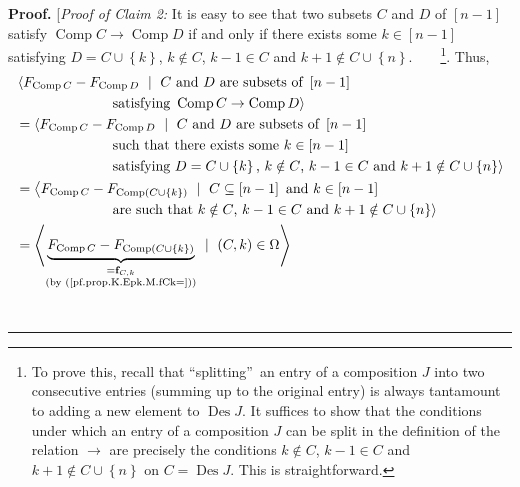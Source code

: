\documentclass[numbers=enddot,12pt,final,onecolumn,notitlepage]{scrartcl}%
\theoremstyle{definition}
\newenvironment{proof}[1][Proof]{\noindent\textbf{#1.} }{\ \rule{0.5em}{0.5em}}
\newenvironment{verlong}{}{}
\begin{document}
\begin{verlong}
\begin{proof}
[\textit{Proof of Claim 2:} It is easy to see that two subsets $C$ and $D$ of
$\left[  n-1\right]  $ satisfy $\operatorname*{Comp}C\rightarrow
\operatorname*{Comp}D$ if and only if there exists some $k\in\left[
n-1\right]  $ satisfying $D=C\cup\left\{  k\right\}  $, $k\notin C$, $k-1\in
C$ and $k+1\notin C\cup\left\{  n\right\}  $.\ \ \ \ \footnote{To prove this,
recall that \textquotedblleft splitting\textquotedblright\ an entry of a
composition $J$ into two consecutive entries (summing up to the original
entry) is always tantamount to adding a new element to $\operatorname*{Des}J$.
It suffices to show that the conditions under which an entry of a composition
$J$ can be split in the definition of the relation $\rightarrow$ are precisely
the conditions $k\notin C$, $k-1\in C$ and $k+1\notin C\cup\left\{  n\right\}
$ on $C=\operatorname*{Des}J$. This is straightforward.}. Thus,%
\begin{align*}
&  \left\langle F_{\operatorname*{Comp}C}-F_{\operatorname*{Comp}D}%
\ \mid\ C\text{ and }D\text{ are subsets of }\left[  n-1\right]  \right. \\
&  \ \ \ \ \ \ \ \ \ \ \ \ \ \ \ \ \ \ \ \ \left.  \text{satisfying
}\operatorname*{Comp}C\rightarrow\operatorname*{Comp}D\right\rangle \\
&  =\left\langle F_{\operatorname*{Comp}C}-F_{\operatorname*{Comp}D}%
\ \mid\ C\text{ and }D\text{ are subsets of }\left[  n-1\right]  \right. \\
&  \ \ \ \ \ \ \ \ \ \ \ \ \ \ \ \ \ \ \ \ \left.  \text{such that there
exists some }k\in\left[  n-1\right]  \right. \\
&  \ \ \ \ \ \ \ \ \ \ \ \ \ \ \ \ \ \ \ \ \left.  \text{satisfying }%
D=C\cup\left\{  k\right\}  \text{, }k\notin C\text{, }k-1\in C\text{ and
}k+1\notin C\cup\left\{  n\right\}  \right\rangle \\
&  =\left\langle F_{\operatorname*{Comp}C}-F_{\operatorname*{Comp}\left(
C\cup\left\{  k\right\}  \right)  }\ \mid\ C\subseteq\left[  n-1\right]
\text{ and }k\in\left[  n-1\right]  \right. \\
&  \ \ \ \ \ \ \ \ \ \ \ \ \ \ \ \ \ \ \ \ \left.  \text{are such that
}k\notin C\text{, }k-1\in C\text{ and }k+1\notin C\cup\left\{  n\right\}
\right\rangle \\
&  =\left\langle \underbrace{F_{\operatorname*{Comp}C}-F_{\operatorname*{Comp}%
\left(  C\cup\left\{  k\right\}  \right)  }}_{\substack{=\mathbf{f}%
_{C,k}\\\text{(by (\ref{pf.prop.K.Epk.M.fCk=}))}}}\ \mid\ \left(  C,k\right)
\in\Omega\right\rangle \\

\end{align*}
\end{proof}
\end{verlong}
\end{document}
